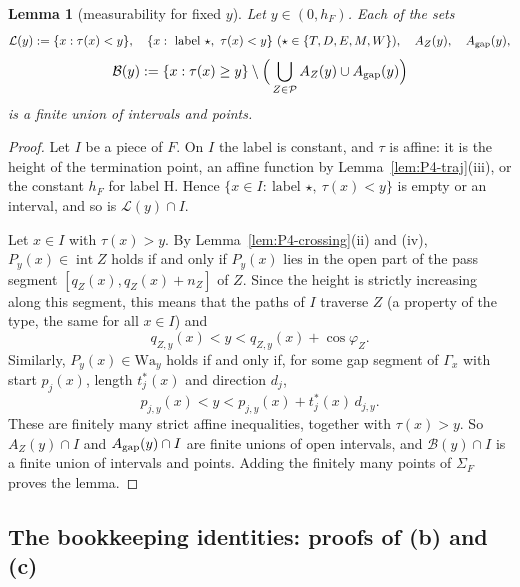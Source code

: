 \documentclass[11pt]{amsart}
\newcommand{\cP}{\mathcal P}
\newtheorem{lemma}[theorem]{Lemma}
\theoremstyle{definition}
\theoremstyle{remark}
\numberwithin{equation}{section}
\begin{document}
\begin{lemma}[measurability for fixed $y$]\label{lem:P4-meas}
Let $y\in(0,h_F)$. Each of the sets
\[
\mathcal L(y):=\{x:\tau(x)<y\},\quad \{x:\ \text{label }\star,\ \tau(x)<y\}\ (\star\in\{T,D,E,M,W\}),\quad A_Z(y),\quad A_{\rm gap}(y),
\]
\[
\mathcal B(y):=\{x:\tau(x)\ge y\}\setminus\Big(\bigcup_{Z\in\cP}A_Z(y)\cup A_{\rm gap}(y)\Big)
\]
is a finite union of intervals and points.
\end{lemma}

\begin{proof}
Let $I$ be a piece of $F$. On $I$ the label is constant, and $\tau$ is affine: it is the height of the termination point, an affine function by Lemma~\ref{lem:P4-traj}(iii), or the constant $h_F$ for label H. Hence $\{x\in I:\ \text{label }\star,\ \tau(x)<y\}$ is empty or an interval, and so is $\mathcal L(y)\cap I$.

Let $x\in I$ with $\tau(x)>y$. By Lemma~\ref{lem:P4-crossing}(ii) and (iv), $P_y(x)\in\operatorname{int}Z$ holds if and only if $P_y(x)$ lies in the open part of the pass segment $[q_Z(x),q_Z(x)+n_Z]$ of $Z$. Since the height is strictly increasing along this segment, this means that the paths of $I$ traverse $Z$ (a property of the type, the same for all $x\in I$) and
\[
q_{Z,y}(x)<y<q_{Z,y}(x)+\cos\varphi_Z .
\]
Similarly, $P_y(x)\in\mathrm{Wa}_y$ holds if and only if, for some gap segment of $\Gamma_x$ with start $p_j(x)$, length $t^*_j(x)$ and direction $d_j$,
\[
p_{j,y}(x)<y<p_{j,y}(x)+t^*_j(x)\,d_{j,y}.
\]
These are finitely many strict affine inequalities, together with $\tau(x)>y$. So $A_Z(y)\cap I$ and $A_{\rm gap}(y)\cap I$ are finite unions of open intervals, and $\mathcal B(y)\cap I$ is a finite union of intervals and points. Adding the finitely many points of $\Sigma_F$ proves the lemma.
\end{proof}

\subsection{The bookkeeping identities: proofs of (b) and (c)}\label{ssec:P4-bc}
\end{document}
